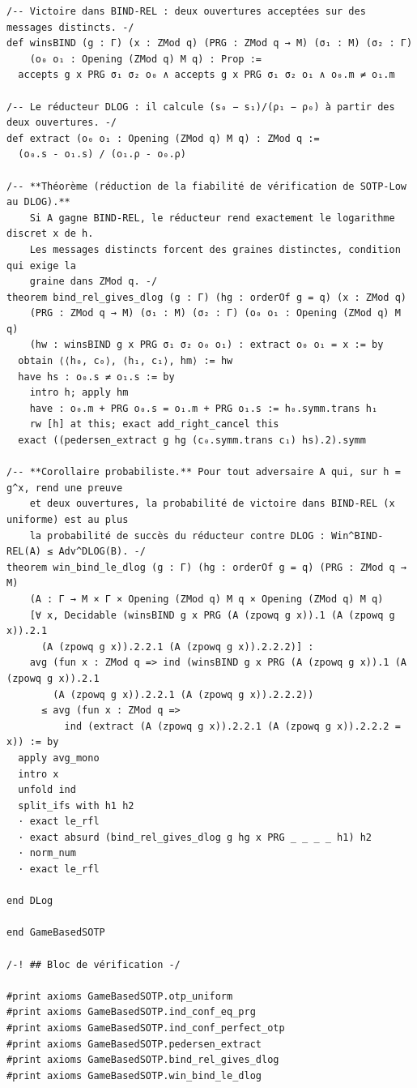 \begin{lstlisting}[caption={M\'ecanisation r\'eduite des r\'eductions de SOTP-Low (version 1.0)}, label={lst:gamebased_lean}, language=Lean4]
/-- Victoire dans BIND-REL : deux ouvertures acceptées sur des messages distincts. -/
def winsBIND (g : Γ) (x : ZMod q) (PRG : ZMod q → M) (σ₁ : M) (σ₂ : Γ)
    (o₀ o₁ : Opening (ZMod q) M q) : Prop :=
  accepts g x PRG σ₁ σ₂ o₀ ∧ accepts g x PRG σ₁ σ₂ o₁ ∧ o₀.m ≠ o₁.m

/-- Le réducteur DLOG : il calcule (s₀ − s₁)/(ρ₁ − ρ₀) à partir des deux ouvertures. -/
def extract (o₀ o₁ : Opening (ZMod q) M q) : ZMod q :=
  (o₀.s - o₁.s) / (o₁.ρ - o₀.ρ)

/-- **Théorème (réduction de la fiabilité de vérification de SOTP-Low au DLOG).**
    Si A gagne BIND-REL, le réducteur rend exactement le logarithme discret x de h.
    Les messages distincts forcent des graines distinctes, condition qui exige la
    graine dans ZMod q. -/
theorem bind_rel_gives_dlog (g : Γ) (hg : orderOf g = q) (x : ZMod q)
    (PRG : ZMod q → M) (σ₁ : M) (σ₂ : Γ) (o₀ o₁ : Opening (ZMod q) M q)
    (hw : winsBIND g x PRG σ₁ σ₂ o₀ o₁) : extract o₀ o₁ = x := by
  obtain ⟨⟨h₀, c₀⟩, ⟨h₁, c₁⟩, hm⟩ := hw
  have hs : o₀.s ≠ o₁.s := by
    intro h; apply hm
    have : o₀.m + PRG o₀.s = o₁.m + PRG o₁.s := h₀.symm.trans h₁
    rw [h] at this; exact add_right_cancel this
  exact ((pedersen_extract g hg (c₀.symm.trans c₁) hs).2).symm

/-- **Corollaire probabiliste.** Pour tout adversaire A qui, sur h = g^x, rend une preuve
    et deux ouvertures, la probabilité de victoire dans BIND-REL (x uniforme) est au plus
    la probabilité de succès du réducteur contre DLOG : Win^BIND-REL(A) ≤ Adv^DLOG(B). -/
theorem win_bind_le_dlog (g : Γ) (hg : orderOf g = q) (PRG : ZMod q → M)
    (A : Γ → M × Γ × Opening (ZMod q) M q × Opening (ZMod q) M q)
    [∀ x, Decidable (winsBIND g x PRG (A (zpowq g x)).1 (A (zpowq g x)).2.1
      (A (zpowq g x)).2.2.1 (A (zpowq g x)).2.2.2)] :
    avg (fun x : ZMod q => ind (winsBIND g x PRG (A (zpowq g x)).1 (A (zpowq g x)).2.1
        (A (zpowq g x)).2.2.1 (A (zpowq g x)).2.2.2))
      ≤ avg (fun x : ZMod q =>
          ind (extract (A (zpowq g x)).2.2.1 (A (zpowq g x)).2.2.2 = x)) := by
  apply avg_mono
  intro x
  unfold ind
  split_ifs with h1 h2
  · exact le_rfl
  · exact absurd (bind_rel_gives_dlog g hg x PRG _ _ _ _ h1) h2
  · norm_num
  · exact le_rfl

end DLog

end GameBasedSOTP

/-! ## Bloc de vérification -/

#print axioms GameBasedSOTP.otp_uniform
#print axioms GameBasedSOTP.ind_conf_eq_prg
#print axioms GameBasedSOTP.ind_conf_perfect_otp
#print axioms GameBasedSOTP.pedersen_extract
#print axioms GameBasedSOTP.bind_rel_gives_dlog
#print axioms GameBasedSOTP.win_bind_le_dlog
\end{lstlisting}

